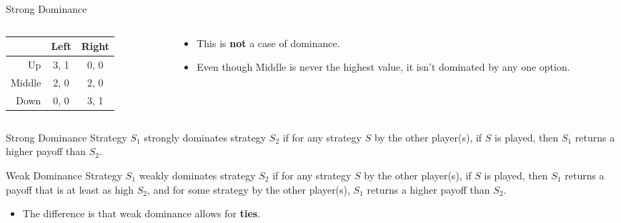\documentclass[
  14pt,
  letterpaper,
  ignorenonframetext,
  aspectratio=169,
]{beamer}
\providecommand{\tightlist}{%
  \setlength{\itemsep}{0pt}\setlength{\parskip}{0pt}}\usepackage{longtable,booktabs,array}
\let\olditem\item
\renewcommand{\item}{%
\olditem\vspace{6pt}}
\begin{document}
\begin{frame}[fragile]{Strong Dominance}
\protect\hypertarget{strong-dominance-2}{}
\begin{columns}[T]
\begin{column}{0.4\textwidth}
\begin{table}[!h]
\centering
\begin{tabular}[t]{>{}r|cc}
\toprule
 & Left & Right\\
\midrule
Up & 3, 1 & 0, 0\\
Middle & 2, 0 & 2, 0\\
Down & 0, 0 & 3, 1\\
\bottomrule
\end{tabular}
\end{table}
\end{column}

\begin{column}{0.6\textwidth}
\begin{itemize}[<+->]
\tightlist
\item
  This is \textbf{not} a case of dominance.
\item
  Even though Middle is never the highest value, it isn't dominated by
  any one option.
\end{itemize}
\end{column}
\end{columns}
\end{frame}

\begin{frame}{Strong Dominance}
\protect\hypertarget{strong-dominance-3}{}
Strategy \(S_1\) strongly dominates strategy \(S_2\) if for any strategy
\(S\) by the other player(s), if \(S\) is played, then \(S_1\) returns a
higher payoff than \(S_2\).
\end{frame}

\begin{frame}{Weak Dominance}
\protect\hypertarget{weak-dominance}{}
Strategy \(S_1\) weakly dominates strategy \(S_2\) if for any strategy
\(S\) by the other player(s), if \(S\) is played, then \(S_1\) returns a
payoff that is at least as high \(S_2\), and for some strategy by the
other player(s), \(S_1\) returns a higher payoff than \(S_2\).

\begin{itemize}[<+->]
\tightlist
\item
  The difference is that weak dominance allows for \textbf{ties}.
\end{itemize}
\end{frame}
\end{document}
